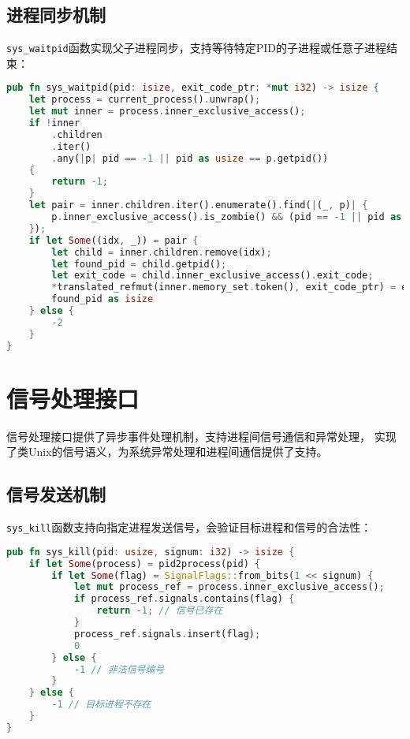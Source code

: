 \subsection{进程同步机制}

\texttt{sys\_waitpid}函数实现父子进程同步，支持等待特定PID的子进程或任意子进程结束：

\begin{lstlisting}[language=Rust,caption={进程等待系统调用}, label={lst:sys-waitpid}]
pub fn sys_waitpid(pid: isize, exit_code_ptr: *mut i32) -> isize {
    let process = current_process().unwrap();
    let mut inner = process.inner_exclusive_access();
    if !inner
        .children
        .iter()
        .any(|p| pid == -1 || pid as usize == p.getpid())
    {
        return -1;
    }
    let pair = inner.children.iter().enumerate().find(|(_, p)| {
        p.inner_exclusive_access().is_zombie() && (pid == -1 || pid as usize == p.getpid())
    });
    if let Some((idx, _)) = pair {
        let child = inner.children.remove(idx);
        let found_pid = child.getpid();
        let exit_code = child.inner_exclusive_access().exit_code;
        *translated_refmut(inner.memory_set.token(), exit_code_ptr) = exit_code;
        found_pid as isize
    } else {
        -2
    }
}
\end{lstlisting}

\section{信号处理接口}

信号处理接口提供了异步事件处理机制，支持进程间信号通信和异常处理，
实现了类Unix的信号语义，为系统异常处理和进程间通信提供了支持。

\subsection{信号发送机制}

\texttt{sys\_kill}函数支持向指定进程发送信号，会验证目标进程和信号的合法性：

\begin{lstlisting}[language=Rust,caption={信号发送系统调用}, label={lst:sys-kill}]
pub fn sys_kill(pid: usize, signum: i32) -> isize {
    if let Some(process) = pid2process(pid) {
        if let Some(flag) = SignalFlags::from_bits(1 << signum) {
            let mut process_ref = process.inner_exclusive_access();
            if process_ref.signals.contains(flag) {
                return -1; // 信号已存在
            }
            process_ref.signals.insert(flag);
            0
        } else {
            -1 // 非法信号编号
        }
    } else {
        -1 // 目标进程不存在
    }
}
\end{lstlisting}

